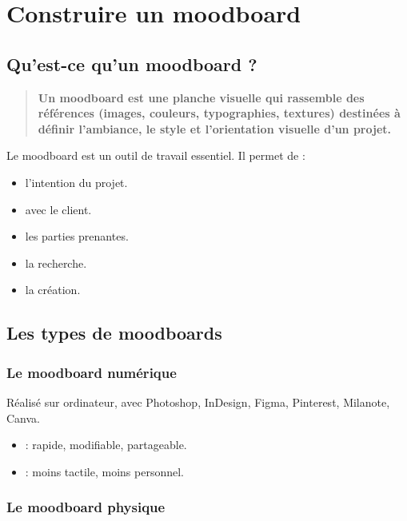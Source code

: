 \section{Construire un moodboard}

\subsection{Qu'est-ce qu'un moodboard ?}

\begin{quote}
\textbf{Un moodboard est une planche visuelle qui rassemble des références (images, couleurs, typographies, textures) destinées à définir l'ambiance, le style et l'orientation visuelle d'un projet.}
\end{quote}

Le moodboard est un outil de travail essentiel. Il permet de :

\begin{itemize}
    \item {} l'intention du projet.
    \item {} avec le client.
    \item {} les parties prenantes.
    \item {} la recherche.
    \item {} la création.
\end{itemize}

\subsection{Les types de moodboards}

\subsubsection{Le moodboard numérique}

Réalisé sur ordinateur, avec Photoshop, InDesign, Figma, Pinterest, Milanote, Canva.

\begin{itemize}
    \item {} : rapide, modifiable, partageable.
    \item {} : moins tactile, moins personnel.
\end{itemize}

\subsubsection{Le moodboard physique}

